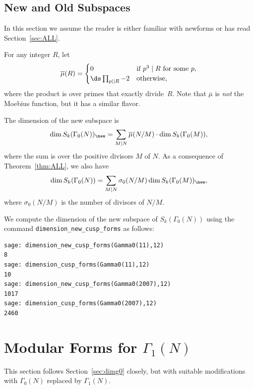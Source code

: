 \subsection{New and Old Subspaces}\label{sec:newold}





In this section we assume the reader is either
familiar with newforms or has read Section~\ref{sec:ALL}.
 
For any integer $R$, let
$$
\overline{\mu}(R) = 
\begin{cases} 
 0 & \text{if $p^3\mid R$ for some $p$,}\\
\ds \prod_{p\mid\mid R} -2 & \text{otherwise},
\end{cases}
$$
where the product is over primes that exactly divide~$R$.
Note that $\overline{\mu}$ is {\em not} the Moebius function, but it
has a similar flavor. 

\begin{proposition}\label{prop:newg0}
The dimension of the new subspace is
$$
 \dim S_k(\Gamma_0(N))_{\new} = \sum_{M\mid N} \overline{\mu}(N/M) 
   \cdot \dim S_k(\Gamma_0(M)),
$$
where the sum is over the positive divisors $M$ of $N$.
As a consequence of Theorem~\ref{thm:ALL},
we also have
$$
  \dim S_k(\Gamma_0(N)) = \sum_{M\mid N} \sigma_0(N/M)
                             \dim S_k(\Gamma_0(M))_{\new},
$$
where $\sigma_0(N/M)$ is the number of divisors of $N/M$.
\end{proposition}

\begin{example}
We compute the dimension of the new subspace of $S_k(\Gamma_0(N))$
using the \sage{} command {\tt dimension\_new\_cusp\_forms}
as follows:
\begin{verbatim}
sage: dimension_new_cusp_forms(Gamma0(11),12)
8
sage: dimension_cusp_forms(Gamma0(11),12)
10
sage: dimension_new_cusp_forms(Gamma0(2007),12)
1017
sage: dimension_cusp_forms(Gamma0(2007),12)
2460
\end{verbatim}
\end{example}








\section{Modular Forms for $\Gamma_1(N)$}
This section follows Section~\ref{sec:dimg0} closely, but with
suitable modifications with $\Gamma_0(N)$ replaced by $\Gamma_1(N)$.

